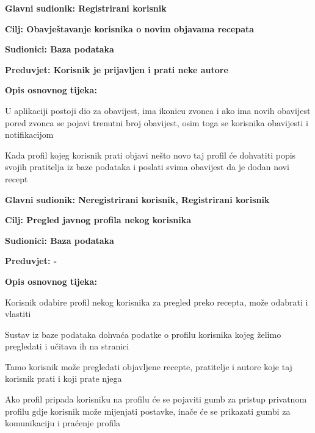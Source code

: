 				
				\noindent {}
				\begin{packed_item}
					
					\item \textbf{Glavni sudionik: Registrirani korisnik}
					\item  \textbf{Cilj: Obavještavanje korisnika o novim objavama recepata } 
					\item  \textbf{Sudionici: Baza podataka} 
					\item  \textbf{Preduvjet: Korisnik je prijavljen i prati neke autore} 
					\item  \textbf{Opis osnovnog tijeka:}
					
					\item[] \begin{packed_enum}
						
						\item U aplikaciji postoji dio za obavijest, ima ikonicu zvonca i ako ima novih obavijest pored zvonca se pojavi trenutni broj obavijest, osim toga se korisnika obavijesti i notifikacijom
						\item Kada profil kojeg korisnik prati objavi nešto novo taj profil će dohvatiti popis svojih pratitelja iz baze podataka i poslati svima obavijest da je dodan novi recept
					\end{packed_enum}
					
				\end{packed_item}
				
				\noindent \underbar{\textbf{UC19 - Pregled javnog profila}}
				\begin{packed_item}
					
					\item \textbf{Glavni sudionik: Neregistrirani korisnik, Registrirani korisnik}
					\item  \textbf{Cilj: Pregled javnog profila nekog korisnika} 
					\item  \textbf{Sudionici: Baza podataka} 
					\item  \textbf{Preduvjet: -} 
					\item  \textbf{Opis osnovnog tijeka:}
					
					\item[] \begin{packed_enum}
						
						\item Korisnik odabire profil nekog korisnika za pregled preko recepta, može odabrati i vlastiti
						\item Sustav iz baze podataka dohvaća podatke o profilu korisnika kojeg želimo pregledati i učitava ih na stranici
						\item Tamo korisnik može pregledati objavljene recepte, pratitelje i autore koje taj korisnik prati i koji prate njega
						\item Ako profil pripada korisniku na profilu će se pojaviti gumb za pristup privatnom profilu gdje korisnik može mijenjati postavke, inače će se prikazati gumbi za komunikaciju i praćenje profila
					\end{packed_enum}
					
				\end{packed_item}
				
